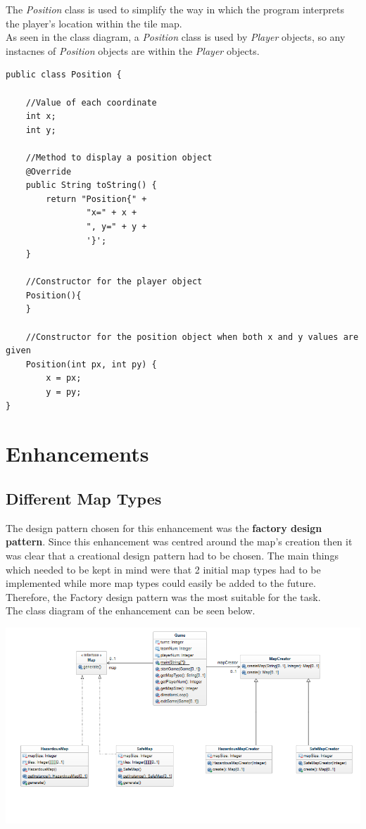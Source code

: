 \documentclass[a4paper,12pt]{extarticle}
\begin{document}
The \textit{Position} class is used to simplify the way in which the program interprets the player's location within the tile map.\\

\noindent As seen in the class diagram, a \textit{Position} class is used by \textit{Player} objects, so any instacnes of \textit{Position} objects are within the \textit{Player} objects.

\begin{lstlisting}
public class Position {

    //Value of each coordinate
    int x;
    int y;

    //Method to display a position object
    @Override
    public String toString() {
        return "Position{" +
                "x=" + x +
                ", y=" + y +
                '}';
    }

    //Constructor for the player object
    Position(){
    }

    //Constructor for the position object when both x and y values are given
    Position(int px, int py) {
        x = px;
        y = py;
}
\end{lstlisting}
\vspace{4mm}

\newpage
\section{Enhancements}
\subsection{Different Map Types}

The design pattern chosen for this enhancement was the \textbf{factory design pattern}. Since this enhancement was centred around the map's creation then it was clear that a creational design pattern had to be chosen. The main things which needed to be kept in mind were that 2 initial map types had to be implemented while more map types could easily be added to the future. Therefore, the Factory design pattern was the most suitable for the task.\\

The class diagram of the enhancement can be seen below.\\

\begin{center}
\includegraphics[width=\textwidth]{Enhancement1CD.png}\\
\end{center}
\end{document}

